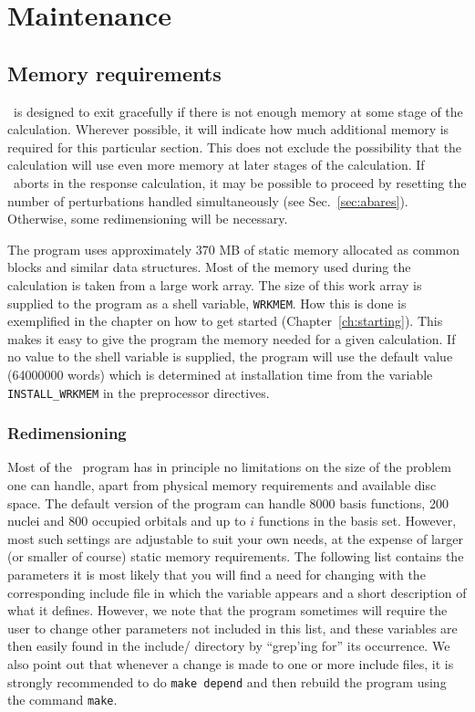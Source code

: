 \chapter{Maintenance}\label{ch:maintain}

\section{Memory requirements}

\dalton\ is designed to exit gracefully if there is not enough
memory at some stage of the calculation.  Wherever possible, it
will indicate how much additional memory is required for this
particular section.  This does not exclude the possibility that
the calculation will use even more memory at later stages of the
calculation. If \dalton\ aborts in the response calculation, it
may be possible to proceed by resetting the number of
perturbations handled simultaneously (see 
Sec.~\ref{sec:abares}).  Otherwise, some redimensioning will be
necessary.

The program uses approximately 370 MB of static memory allocated as common
blocks and similar data structures. Most of the memory used during the
calculation is taken from a large work array. The size of this work
array is supplied to the program as a shell
variable, \verb|WRKMEM|.
How this is done is exemplified in the chapter on how to get started
(Chapter~\ref{ch:starting}). This makes it easy
to give the program the memory needed for a given calculation. If no
value to the shell 
variable is supplied, the program will use the default value
(64000000 words) which is
determined at installation time from the variable
\verb|INSTALL_WRKMEM| in the preprocessor
directives.

\subsection{Redimensioning \dalton}

Most of the \dalton\ program has in principle no limitations on
the size of the problem one can handle, apart from
physical memory requirements and available disc space. The default
version of the program can handle 8000 basis functions, 200 nuclei and
800 occupied orbitals and up to $i$ functions in the basis
set. However, most such settings are adjustable to suit your own
needs, at the expense of larger (or smaller of course) static memory
requirements. The following list contains the parameters it is
most likely that you will find a need for changing with the
corresponding include 
file in which the variable appears and a short description of what
it defines. However, we note that the program sometimes will
require the user to change other parameters not included in this
list, and these variables are then easily found in the include/
directory by ``grep'ing for'' its occurrence. We also point out that
whenever a change is made to one or more include files, it is strongly
recommended to do \verb|make depend| and then rebuild the program using the
command \verb|make|.

